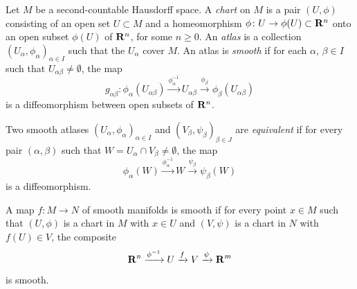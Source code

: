 \documentclass[a4paper,openany]{scrbook}
\begin{document}
\begin{defn}
Let $M$ be a second-countable Hausdorff space. A \emph{chart} on $M$ is a pair $(U,\phi)$ consisting of an open set $U \subset M$ and a homeomorphism $\phi\colon U \to \phi(U) \subset \mathbf R^n$ onto an open subset $\phi(U)$ of $\mathbf R^n$, for some $n \geq 0$. An \emph{atlas} is a collection $(U_\alpha,\phi_\alpha)_{\alpha \in I}$ such that the $U_\alpha$ cover $M$. An atlas is \emph{smooth} if for each $\alpha$, $\beta \in I$ such that $U_{\alpha\beta} \neq \emptyset$, the map
\begin{equation}\label{eq:coordinatechange}
g_{\alpha\beta}\colon \phi_\alpha(U_{\alpha\beta}) \xrightarrow{\phi_{\alpha}^{-1}} U_{\alpha\beta} \xrightarrow{\phi_\beta} \phi_\beta(U_{\alpha\beta})
\end{equation}
is a diffeomorphism between open subsets of $\mathbf R^n$.

Two smooth atlases $(U_\alpha,\phi_\alpha)_{\alpha \in I}$ and $(V_\beta,\psi_\beta)_{\beta \in J}$ are \emph{equivalent} if for every pair $(\alpha,\beta)$ such that $W = U_\alpha \cap V_\beta \neq \emptyset$, the map
\[
\phi_\alpha(W) \xrightarrow{\phi_\alpha^{-1}} W \xrightarrow{\psi_\beta} \psi_\beta(W)
\]
is a diffeomorphism.

A map $f\colon M \to N$ of smooth manifolds is smooth if for every point $x \in M$ such that $(U,\phi)$ is a chart in $M$ with $x \in U$ and $(V,\psi)$ is a chart in $N$ with $f(U) \in V$, the composite
\[
\mathbf R^n \xrightarrow{\phi^{-1}} U \xrightarrow{f} V \xrightarrow{\psi} \mathbf R^m
\]
is smooth.
\end{defn}
\end{document}
